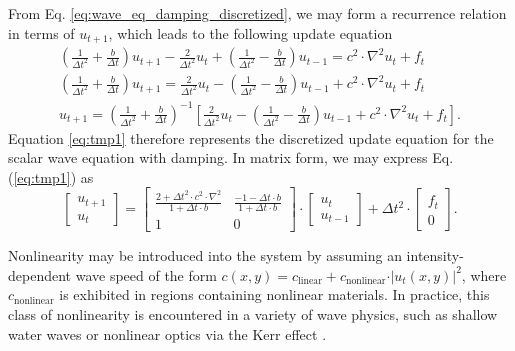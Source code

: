 From Eq. \ref{eq:wave_eq_damping_discretized}, we may form a recurrence relation in terms of $u_{t+1}$, which leads to the following update equation
\begin{align}
    \left( \frac{1}{\Delta{t}^2} + \frac{b}{\Delta{t}}\right) u_{t+1} - \frac{2}{\Delta{t}^2} u_t  + \left( \frac{1}{\Delta{t}^2} - \frac{b}{\Delta{t}} \right) u_{t-1} = c^2 \cdot \nabla^2 u_t + f_t \nonumber \\
    \left( \frac{1}{\Delta{t}^2} + \frac{b}{\Delta{t}}\right) u_{t+1} = \frac{2}{\Delta{t}^2} u_t  - \left( \frac{1}{\Delta{t}^2} - \frac{b}{\Delta{t}} \right) u_{t-1} + c^2 \cdot\nabla^2 u_t + f_t \nonumber \\
    u_{t+1} = \left( \frac{1}{\Delta{t}^2} + \frac{b}{\Delta{t}}\right)^{-1} \left[ \frac{2}{\Delta{t}^2} u_t - \left( \frac{1}{\Delta{t}^2} - \frac{b}{\Delta{t}} \right) u_{t-1} + c^2\cdot \nabla^2 u_t + f_t \right].
    \label{eq:tmp1}
\end{align}
Equation \ref{eq:tmp1} therefore represents the discretized update equation for the scalar wave equation with damping. In matrix form, we may express Eq. (\ref{eq:tmp1}) as
\begin{equation}
    \begin{bmatrix}
    u_{t+1} \\ u_t
    \end{bmatrix}
    = 
    \begin{bmatrix}
    \frac{2 + \Delta t^2\cdot c^2 \cdot \nabla^2}{1 + \Delta t\cdot b} 
    & \frac{-1 - \Delta t\cdot b}{1 + \Delta t\cdot b}  \\
    1 & 0
    \end{bmatrix}
    \cdot
    \begin{bmatrix}
    u_{t} \\ u_{t-1}
    \end{bmatrix}    
    +
    \Delta{t}^2 \cdot \begin{bmatrix}
     f_{t} \\ 0
    \end{bmatrix}.
    \label{eq:update_damped}
\end{equation}

Nonlinearity may be introduced into the system by assuming an intensity-dependent wave speed of the form $c{(x,y)} = c_{\text{linear}} + c_{\text{nonlinear}} \cdot \vert u_t{(x,y)} \vert^2$, where $c_{\text{nonlinear}}$ is exhibited in regions containing nonlinear materials.
In practice, this class of nonlinearity is encountered in a variety of wave physics, such as shallow water waves \cite{ursell_long-wave_1953} or nonlinear optics via the Kerr effect \cite{boyd_nonlinear_2008}.

